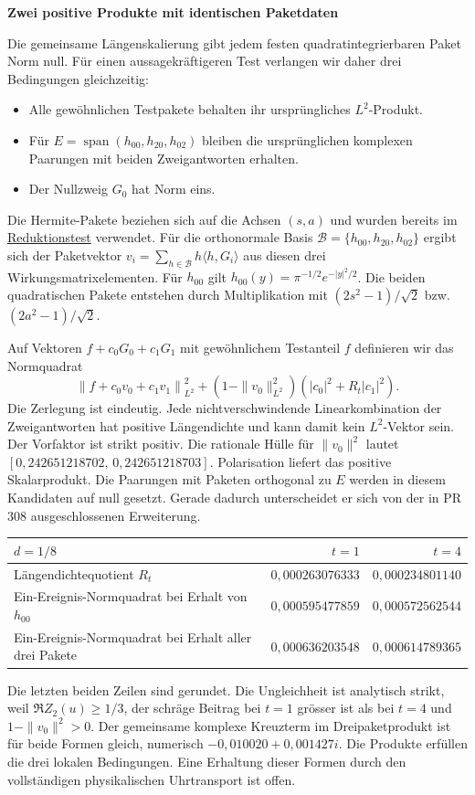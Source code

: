 \documentclass[11pt,a4paper]{article}
\newcommand{\titleline}[1]{{\LARGE\bfseries #1}\par\vspace{5pt}}
\newcommand{\repo}{https://github.com/thomasmgfeller/x6-spectral-astrolabium/blob/8222202f6b27a60218afe6cfbf1a5b8c7be423ea/research/rax_cqg/dust_collapse}
\begin{document}
\newpage
\titleline{Zwei positive Produkte mit identischen Paketdaten}
Die gemeinsame Längenskalierung gibt jedem festen quadratintegrierbaren Paket Norm null. Für einen aussagekräftigeren Test verlangen wir daher drei Bedingungen gleichzeitig:
\begin{itemize}\setlength\itemsep{0pt}
\item Alle gewöhnlichen Testpakete behalten ihr ursprüngliches $L^2$-Produkt.
\item Für $E=\operatorname{span}(h_{00},h_{20},h_{02})$ bleiben die ursprünglichen komplexen Paarungen mit beiden Zweigantworten erhalten.
\item Der Nullzweig $G_0$ hat Norm eins.
\end{itemize}
Die Hermite-Pakete beziehen sich auf die Achsen $(s,a)$ und wurden bereits im \href{\repo/reduction_gluing_v0_1/DERIVATION.md}{Reduktionstest} verwendet. Für die orthonormale Basis $\mathcal B=\{h_{00},h_{20},h_{02}\}$ ergibt sich der Paketvektor $v_i=\sum_{h\in\mathcal B}h\langle h,G_i\rangle$ aus diesen drei Wirkungsmatrixelementen. Für $h_{00}$ gilt $h_{00}(y)=\pi^{-1/2}e^{-|y|^2/2}$. Die beiden quadratischen Pakete entstehen durch Multiplikation mit $(2s^2-1)/\sqrt2$ bzw. $(2a^2-1)/\sqrt2$.

Auf Vektoren $f+c_0G_0+c_1G_1$ mit gewöhnlichem Testanteil $f$ definieren wir das Normquadrat
\[
 \left\| f+ c_0 v_0+c_1 v_1\right\|_{L^2}^2
 +(1-\|v_0\|_{L^2}^2)\left(|c_0|^2+R_t |c_1|^2\right).
\]
Die Zerlegung ist eindeutig. Jede nichtverschwindende Linearkombination der Zweigantworten hat positive Längendichte und kann damit kein $L^2$-Vektor sein. Der Vorfaktor ist strikt positiv. Die rationale Hülle für $\|v_0\|^2$ lautet $[0{,}242651218702,\,0{,}242651218703]$. Polarisation liefert das positive Skalarprodukt. Die Paarungen mit Paketen orthogonal zu $E$ werden in diesem Kandidaten auf null gesetzt. Gerade dadurch unterscheidet er sich von der in PR 308 ausgeschlossenen Erweiterung.

\begin{center}\begin{tabular}{@{}lrr@{}}\toprule
$d=1/8$ & $t=1$ & $t=4$\\\midrule
Längendichtequotient $R_t$ & $0{,}000263076333$ & $0{,}000234801140$\\
Ein-Ereignis-Normquadrat bei Erhalt von $h_{00}$ & $0{,}000595477859$ & $0{,}000572562544$\\
Ein-Ereignis-Normquadrat bei Erhalt aller drei Pakete & $0{,}000636203548$ & $0{,}000614789365$\\\bottomrule\end{tabular}\end{center}
Die letzten beiden Zeilen sind gerundet. Die Ungleichheit ist analytisch strikt, weil $\Re Z_2(u)\geq1/3$, der schräge Beitrag bei $t=1$ grösser ist als bei $t=4$ und $1-\|v_0\|^2>0$. Der gemeinsame komplexe Kreuzterm im Dreipaketprodukt ist für beide Formen gleich, numerisch $-0{,}010020+0{,}001427i$. Die Produkte erfüllen die drei lokalen Bedingungen. Eine Erhaltung dieser Formen durch den vollständigen physikalischen Uhrtransport ist offen.
\end{document}
